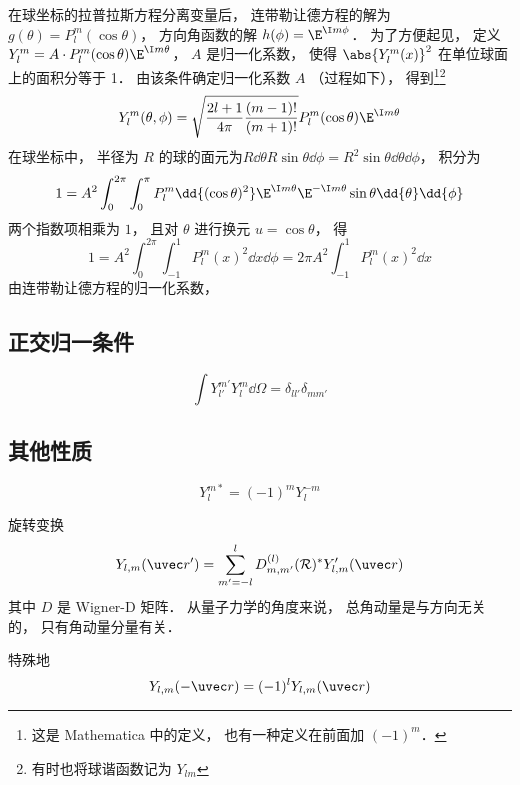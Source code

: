 

在球坐标的拉普拉斯方程分离变量后， 连带勒让德方程的解为 $g(\theta) = P_l^m(\cos\theta)$， 方向角函数的解 $h(\phi) = \E^{\I m\phi}$． 为了方便起见， 定义 $Y_l^m = A \cdot P_l^m(\cos \theta) \E^{\I m\theta}$， $A$ 是归一化系数， 使得 $\abs{Y_l^m (x)}^2$ 在单位球面上的面积分等于 1． 由该条件确定归一化系数 $A$ （过程如下）， 得到\footnote{这是 Mathematica 中的定义， 也有一种定义在前面加 $(-1)^m$．}\footnote{有时也将球谐函数记为 $Y_{lm}$}
\begin{equation}
Y_l^m (\theta ,\phi) = \sqrt{\frac{2l + 1}{4\pi }\frac{(m - 1)!}{(m + 1)!}} P_l^m (\cos\theta) \E^{\I m\theta}
\end{equation}
在球坐标中， 半径为 $R$ 的球的面元为$R \dd{\theta} R\sin\theta \dd{\phi} = R^2 \sin\theta \dd{\theta} \dd{\phi}$，  积分为
\begin{equation}
1 = A^2\int_0^{2\pi } \int_0^\pi  P_l^m \dd{(\cos \theta)^2} \E^{\I m\theta} \E^{-\I m\theta}\sin\theta \dd{\theta} \dd{\phi}
\end{equation}
两个指数项相乘为 $1$，  且对 $\theta$ 进行换元 $u = \cos\theta $， 得
\begin{equation}
1 = A^2 \int_0^{2\pi} \int_{-1}^1 P_l^m {{(x)}^2} \dd{x} \dd{\phi} = 2\pi A^2 \int_{-1}^1 P_l^m (x)^2 \dd{x} 
\end{equation}
由连带勒让德方程的归一化系数， %


\subsection{正交归一条件}
\begin{equation}
\int Y_{l'}^{m'} Y_l^m \dd{\Omega} = \delta_{ll'}\delta_{mm'}
\end{equation}

\subsection{其他性质}
\begin{equation}
Y_l^{m*} = (-1)^m Y_l^{-m}
\end{equation}

旋转变换
\begin{equation}
Y_{l,m}(\uvec r') = \sum_{m'=-l}^l D_{m,m'}^{(l)} (\mathcal R)^* Y_{l,m}'(\uvec r)
\end{equation}
其中 $D$ 是 Wigner-D 矩阵． 从量子力学的角度来说， 总角动量是与方向无关的， 只有角动量分量有关．

特殊地
\begin{equation}
Y_{l,m}(-\uvec r) = (-1)^l Y_{l,m}(\uvec r)
\end{equation}
